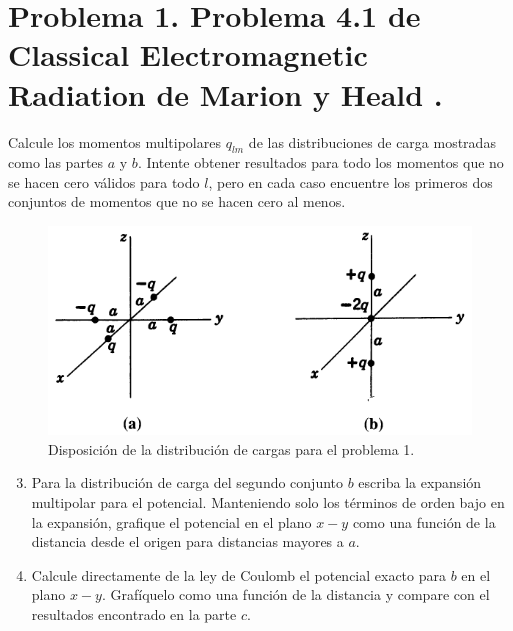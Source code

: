 \documentclass[a4paper,11pt]{article}
\numberwithin{equation}{section}
\renewcommand{\thefootnote}{\fnsymbol{footnote}}
\begin{document}

\fancyhead[R]{\thepage}

\setcounter{footnote}{0}
\renewcommand*{\thefootnote}{\arabic{footnote}}

\section{Problema 1. Problema 4.1 de Classical Electromagnetic Radiation
de Marion y Heald \cite{marion2}.}

Calcule los momentos multipolares $q_{lm}$ de las distribuciones de carga mostradas 
como las partes $a$ y $b$. Intente obtener resultados para todo los momentos que 
no se hacen cero válidos para todo $l$, pero en cada caso encuentre los primeros 
dos conjuntos de momentos que no se hacen cero al menos.

\begin{figure}[H]
 \center 
 \includegraphics[scale = 0.5]{problema1fig1}
 \caption{Disposición de la distribución de cargas para el problema 1.}
\end{figure}

\begin{enumerate}[label=\textbf{(\alph*)}]
\setcounter{enumi}{2}
\item Para la distribución de carga del segundo conjunto $b$ escriba la expansión 
multipolar para el potencial. Manteniendo solo los términos de orden bajo en la 
expansión, grafique el potencial en el plano $x-y$ como una función de la distancia 
desde el origen para distancias mayores a $a$.
\item Calcule directamente de la ley de Coulomb el potencial exacto para $b$ en 
el plano $x-y$. Grafíquelo como una función de la distancia y compare con el resultados
encontrado en la parte $c$.
\end{enumerate}
\end{document}
